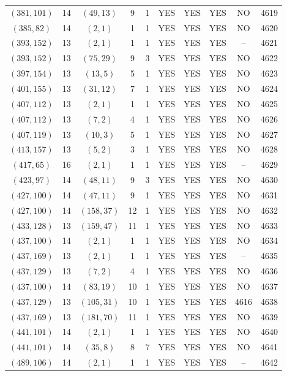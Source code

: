 \begin{longtable}{|c|c|c|c|c|c|c|c|c|c|}
$(381, 101)$ & 14 & $(49, 13)$ & 9 & 1 & YES & YES & YES & NO & 4619\\
$(385, 82)$ & 14 & $(2, 1)$ & 1 & 1 & YES & YES & YES & NO & 4620\\
$(393, 152)$ & 13 & $(2, 1)$ & 1 & 1 & YES & YES & YES & -- & 4621\\
$(393, 152)$ & 13 & $(75, 29)$ & 9 & 3 & YES & YES & YES & NO & 4622\\
$(397, 154)$ & 13 & $(13, 5)$ & 5 & 1 & YES & YES & YES & NO & 4623\\
$(401, 155)$ & 13 & $(31, 12)$ & 7 & 1 & YES & YES & YES & NO & 4624\\
$(407, 112)$ & 13 & $(2, 1)$ & 1 & 1 & YES & YES & YES & NO & 4625\\
$(407, 112)$ & 13 & $(7, 2)$ & 4 & 1 & YES & YES & YES & NO & 4626\\
$(407, 119)$ & 13 & $(10, 3)$ & 5 & 1 & YES & YES & YES & NO & 4627\\
$(413, 157)$ & 13 & $(5, 2)$ & 3 & 1 & YES & YES & YES & NO & 4628\\
$(417, 65)$ & 16 & $(2, 1)$ & 1 & 1 & YES & YES & YES & -- & 4629\\
$(423, 97)$ & 14 & $(48, 11)$ & 9 & 3 & YES & YES & YES & NO & 4630\\
$(427, 100)$ & 14 & $(47, 11)$ & 9 & 1 & YES & YES & YES & NO & 4631\\
$(427, 100)$ & 14 & $(158, 37)$ & 12 & 1 & YES & YES & YES & NO & 4632\\
$(433, 128)$ & 13 & $(159, 47)$ & 11 & 1 & YES & YES & YES & NO & 4633\\
$(437, 100)$ & 14 & $(2, 1)$ & 1 & 1 & YES & YES & YES & NO & 4634\\
$(437, 169)$ & 13 & $(2, 1)$ & 1 & 1 & YES & YES & YES & -- & 4635\\
$(437, 129)$ & 13 & $(7, 2)$ & 4 & 1 & YES & YES & YES & NO & 4636\\
$(437, 100)$ & 14 & $(83, 19)$ & 10 & 1 & YES & YES & YES & NO & 4637\\
$(437, 129)$ & 13 & $(105, 31)$ & 10 & 1 & YES & YES & YES & 4616 & 4638\\
$(437, 169)$ & 13 & $(181, 70)$ & 11 & 1 & YES & YES & YES & NO & 4639\\
$(441, 101)$ & 14 & $(2, 1)$ & 1 & 1 & YES & YES & YES & NO & 4640\\
$(441, 101)$ & 14 & $(35, 8)$ & 8 & 7 & YES & YES & YES & NO & 4641\\
$(489, 106)$ & 14 & $(2, 1)$ & 1 & 1 & YES & YES & YES & -- & 4642\\

\end{longtable}
